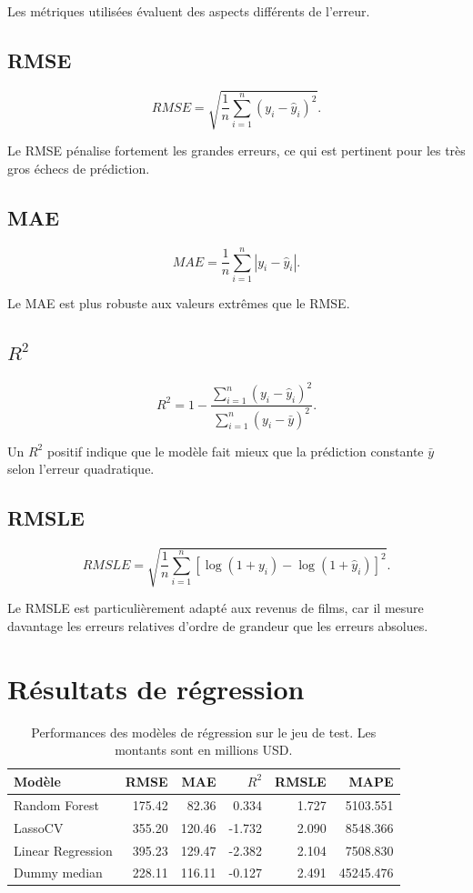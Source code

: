 \documentclass[11pt,a4paper]{article}
\begin{document}
Les métriques utilisées évaluent des aspects différents de l'erreur.

\subsection{RMSE}

\[
RMSE =
\sqrt{
\frac{1}{n}
\sum_{i=1}^{n}
(y_i - \hat{y}_i)^2
}.
\]

Le RMSE pénalise fortement les grandes erreurs, ce qui est pertinent pour les très gros échecs de prédiction.

\subsection{MAE}

\[
MAE =
\frac{1}{n}
\sum_{i=1}^{n}
|y_i - \hat{y}_i|.
\]

Le MAE est plus robuste aux valeurs extrêmes que le RMSE.

\subsection{$R^2$}

\[
R^2 =
1 -
\frac{
\sum_{i=1}^{n}
(y_i - \hat{y}_i)^2
}{
\sum_{i=1}^{n}
(y_i - \bar{y})^2
}.
\]

Un $R^2$ positif indique que le modèle fait mieux que la prédiction constante $\bar{y}$ selon l'erreur quadratique.

\subsection{RMSLE}

\[
RMSLE =
\sqrt{
\frac{1}{n}
\sum_{i=1}^{n}
\left[
\log(1+y_i) - \log(1+\hat{y}_i)
\right]^2
}.
\]

Le RMSLE est particulièrement adapté aux revenus de films, car il mesure davantage les erreurs relatives d'ordre de grandeur que les erreurs absolues.

\section{Résultats de régression}

\begin{table}[H]
\centering
\small
\caption{Performances des modèles de régression sur le jeu de test. Les montants sont en millions USD.}
\begin{tabular}{lrrrrr}
\toprule
Modèle & RMSE & MAE & $R^2$ & RMSLE & MAPE \\
\midrule
Random Forest & 175.42 & 82.36 & 0.334 & 1.727 & 5103.551 \\
LassoCV & 355.20 & 120.46 & -1.732 & 2.090 & 8548.366 \\
Linear Regression & 395.23 & 129.47 & -2.382 & 2.104 & 7508.830 \\
Dummy median & 228.11 & 116.11 & -0.127 & 2.491 & 45245.476 \\
\bottomrule
\end{tabular}
\end{table}
\end{document}
